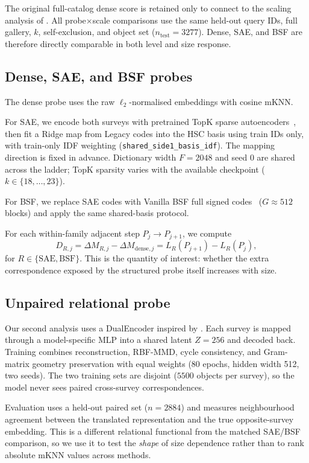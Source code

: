 \documentclass[11pt]{article}
\begin{document}
The original full-catalog dense score is retained only to connect to the scaling analysis of \citet{duraphe2025platonicuniverse}.
All probe\(\times\)scale comparisons use the same held-out query IDs, full gallery, \(k\), self-exclusion, and object set (\(n_{\mathrm{test}}{=}3277\)).
Dense, SAE, and BSF are therefore directly comparable in both level and size response.

\subsection{Dense, SAE, and BSF probes}

The dense probe uses the raw \(\ell_2\)-normalised embeddings with cosine mKNN.

For SAE, we encode both surveys with pretrained TopK sparse autoencoders~\citep{gao2025sae}, then fit a Ridge map from Legacy codes into the HSC basis using train IDs only, with train-only IDF weighting (\texttt{shared\_side1\_basis\_idf}).
The mapping direction is fixed in advance.
Dictionary width \(F{=}2048\) and seed \(0\) are shared across the ladder; TopK sparsity varies with the available checkpoint (\(k\in\{18,\ldots,23\}\)).

For BSF, we replace SAE codes with Vanilla BSF full signed codes~\citep{fel2026bsf} (\(G{\approx}512\) blocks) and apply the same shared-basis protocol.

For each within-family adjacent step \(P_j\to P_{j+1}\), we compute
\[
D_{R,j}
=
\Delta M_{R,j}
-
\Delta M_{\mathrm{dense},j}
=
L_R(P_{j+1})-L_R(P_j),
\]
for \(R\in\{\mathrm{SAE},\mathrm{BSF}\}\).
This is the quantity of interest: whether the extra correspondence exposed by the structured probe itself increases with size.

\subsection{Unpaired relational probe}

Our second analysis uses a DualEncoder inspired by \citet{jha2025vec2vec}.
Each survey is mapped through a model-specific MLP into a shared latent \(Z{=}256\) and decoded back.
Training combines reconstruction, RBF-MMD, cycle consistency, and Gram-matrix geometry preservation with equal weights (80 epochs, hidden width 512, two seeds).
The two training sets are disjoint (\(5500\) objects per survey), so the model never sees paired cross-survey correspondences.

Evaluation uses a held-out paired set (\(n{=}2884\)) and measures neighbourhood agreement between the translated representation and the true opposite-survey embedding.
This is a different relational functional from the matched SAE/BSF comparison, so we use it to test the \emph{shape} of size dependence rather than to rank absolute mKNN values across methods.
\end{document}
